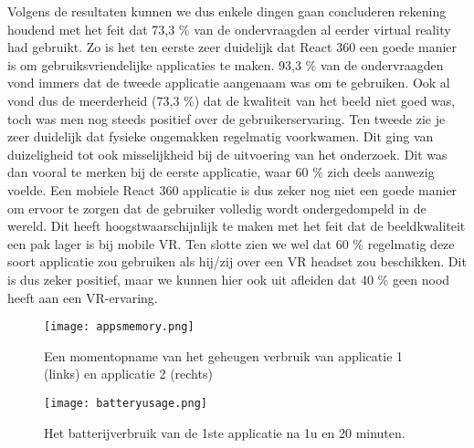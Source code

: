 Volgens de resultaten kunnen we dus enkele dingen gaan concluderen rekening houdend met het feit dat 73,3 \% van de ondervraagden al eerder virtual reality had gebruikt. Zo is het ten eerste zeer duidelijk dat React 360 een goede manier is om gebruiksvriendelijke applicaties te maken. 93,3 \% van de ondervraagden vond immers dat de tweede applicatie aangenaam was om te gebruiken. Ook al vond dus de meerderheid (73,3 \%) dat de kwaliteit van het beeld niet goed was, toch was men nog steeds positief over de gebruikerservaring. Ten tweede zie je zeer duidelijk dat fysieke ongemakken regelmatig voorkwamen. Dit ging van duizeligheid tot ook misselijkheid bij de uitvoering van het onderzoek. Dit was dan vooral te merken bij de eerste applicatie, waar  60 \% zich deels aanwezig voelde. Een mobiele React 360 applicatie is dus zeker nog niet een goede manier om ervoor te zorgen dat de gebruiker volledig wordt ondergedompeld in de wereld. Dit heeft hoogstwaarschijnlijk te maken met het feit dat de beeldkwaliteit een pak lager is bij mobile VR. Ten slotte zien we wel dat 60 \% regelmatig deze soort applicatie zou gebruiken als hij/zij over een VR headset zou beschikken. Dit is dus zeker positief, maar we kunnen hier ook uit afleiden dat 40 \% geen nood heeft aan een VR-ervaring.

\begin{figure}
	\centering
	\texttt{[image: appsmemory.png]}
	\caption{Een momentopname van het geheugen verbruik van applicatie 1 (links) en applicatie 2 (rechts)}
	\label{fig:appsmemory}
\end{figure}

\begin{figure}
	\centering
	\texttt{[image: batteryusage.png]}
	\caption{Het batterijverbruik van de 1ste applicatie na 1u en 20 minuten.}
	\label{fig:batteryusage}
\end{figure}
